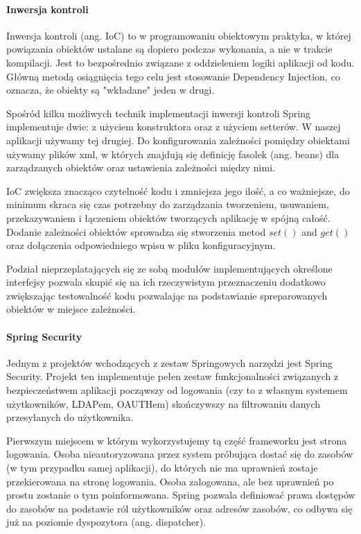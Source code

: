 \documentclass[licencjacka]{pracamgr}
\begin{document}
\paragraph{Inwersja kontroli}
Inwersja kontroli (ang. IoC) to w programowaniu obiektowym praktyka, w której powiązania obiektów ustalane są dopiero podczas wykonania, a nie w trakcie kompilacji. Jest to bezpośrednio związane z oddzieleniem logiki aplikacji od kodu. Główną metodą osiągnięcia tego celu jest stosowanie Dependency Injection, co oznacza, że obiekty są "wkładane" jeden w drugi.

Spośród kilku możliwych technik implementacji inwersji kontroli Spring implementuje dwie: z użyciem konstruktora oraz z użyciem setterów. W naszej aplikacji używamy tej drugiej. Do konfigurowania zależności pomiędzy obiektami używamy plików xml, w których znajdują się definicję fasolek (ang. beans) dla zarządzanych obiektów oraz ustawienia zależności między nimi.

IoC zwiększa znacząco czytelność kodu i zmniejsza jego ilość, a co ważniejsze, do minimum skraca się czas potrzebny do zarządzania tworzeniem, usuwaniem, przekazywaniem i łączeniem obiektów tworzących aplikację w spójną całość. Dodanie zależności obiektów sprowadza się stworzenia metod $set()$ and $get()$ oraz dołączenia odpowiedniego wpisu w pliku konfiguracyjnym.

Podział nieprzeplatających się ze sobą modułów implementujących określone interfejsy pozwala skupić się na ich rzeczywistym przeznaczeniu dodatkowo zwiększając testowalność kodu pozwalając na podstawianie spreparowanych obiektów w miejsce zależności.

\paragraph{Spring Security}
Jednym z projektów wchodzących z zestaw Springowych narzędzi jest Spring Security. Projekt ten implementuje pełen zestaw funkcjonalności związanych z bezpieczeństwem aplikacji począwszy od logowania (czy to z własnym systemem użytkowników, LDAPem, OAUTHem) skończywszy na filtrowaniu danych przesyłanych do użytkownika.

Pierwszym miejscem w którym wykorzystujemy tą część frameworku jest strona logowania. Osoba nieautoryzowana przez system próbująca dostać się do zasobów (w tym przypadku samej aplikacji), do których nie ma uprawnień zostaje przekierowana na stronę logowania. Osoba zalogowana, ale bez uprawnień po prostu zostanie o tym poinformowana. Spring pozwala definiować prawa dostępów do zasobów na podstawie ról użytkowników oraz adresów zasobów, co odbywa się już na poziomie dyspozytora (ang. dispatcher).
\end{document}
